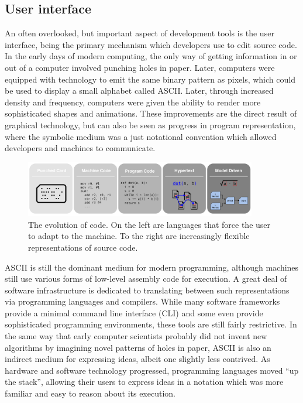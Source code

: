 \documentclass[12pt,initial,twoside,maitrise]{dms}
\numberwithin{equation}{section}
\numberwithin{table}{chapter}
\numberwithin{figure}{chapter}
\begin{document}
\subsection{User interface}

An often overlooked, but important aspect of development tools is the user interface, being the primary mechanism which developers use to edit source code. In the early days of modern computing, the only way of getting information in or out of a computer involved punching holes in paper. Later, computers were equipped with technology to emit the same binary pattern as pixels, which could be used to display a small alphabet called ASCII. Later, through increased density and frequency, computers were given the ability to render more sophisticated shapes and animations. These improvements are the direct result of graphical technology, but can also be seen as progress in program representation, where the symbolic medium was a just notational convention which allowed developers and machines to communicate.

\begin{figure}
    \centering
    \includegraphics[width=0.90\textwidth]{../figures/progress_in_program.png}
    \caption{The evolution of code. On the left are languages that force the user to adapt to the machine. To the right are increasingly flexible representations of source code.}
    \label{fig:evolution_of_programming}
\end{figure}

ASCII is still the dominant medium for modern programming, although machines still use various forms of low-level assembly code for execution. A great deal of software infrastructure is dedicated to translating between such representations via programming languages and compilers. While many software frameworks provide a minimal command line interface (CLI) and some even provide sophisticated programming environments, these tools are still fairly restrictive. In the same way that early computer scientists probably did not invent new algorithms by imagining novel patterns of holes in paper, ASCII is also an indirect medium for expressing ideas, albeit one slightly less contrived. As hardware and software technology progressed, programming languages moved ``up the stack'', allowing their users to express ideas in a notation which was more familiar and easy to reason about its execution.
\end{document}
